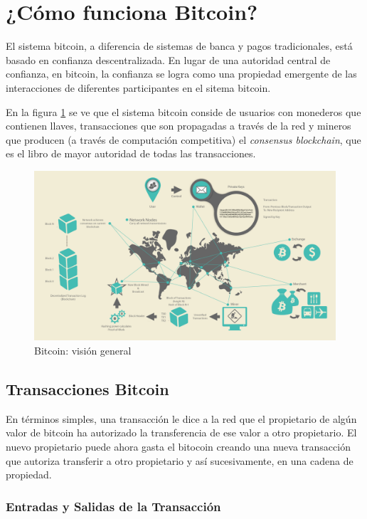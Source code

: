\documentclass[10pt,journal,compsoc]{IEEEtran}
\begin{document}
\section{¿Cómo funciona Bitcoin?}
El sistema bitcoin, a diferencia de sistemas de banca y pagos tradicionales, está basado en confianza descentralizada. En lugar de una autoridad central de confianza, en bitcoin, la confianza se logra como una propiedad emergente de las interacciones de diferentes participantes en el sitema bitcoin. 

En la figura \ref{fig:bitcoin-overview} se ve que el sistema bitcoin conside de usuarios con monederos que contienen llaves, transacciones que son propagadas a través de la red y mineros que producen (a través de computación competitiva) el \emph{consensus blockchain}, que es el libro de mayor autoridad de todas las transacciones. 

\begin{figure}[h]
    \center
    \includegraphics[width=15cm]{bitcoin-overview}
    \caption{Bitcoin: visión general}
    \label{fig:bitcoin-overview}
\end{figure}

\subsection{Transacciones Bitcoin}
En términos simples, una transacción le dice a la red que el propietario de algún valor de bitcoin ha autorizado la transferencia de ese valor a otro propietario. El nuevo propietario puede ahora gasta el bitocoin creando una nueva transacción que autoriza transferir a otro propietario y así sucesivamente, en una cadena de propiedad.

\subsubsection{Entradas y Salidas de la Transacción}
\end{document}
